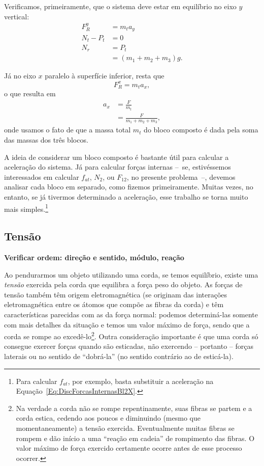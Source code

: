 Verificamos, primeiramente, que o sistema deve estar em equilíbrio no eixo $y$ vertical: 
\begin{align}
    F_R^y &= m_t a_y \\
    N_t - P_t &= 0 \\
    N_r &= P_t \\
    &= (m_1 + m_2 + m_3) g.
\end{align}

Já no eixo $x$ paralelo à superfície inferior, resta que
\begin{equation}
    F_R^x = m_t a_x,
 \end{equation}
 o que resulta em
\begin{align}
    a_x &= \frac{F}{m_t} \\
    &= \frac{F}{m_1 + m_2 + m_3},
\end{align}
%
onde usamos o fato de que a massa total $m_t$ do bloco composto é dada pela soma das massas dos três blocos.

A ideia de considerar um bloco composto é bastante útil para calcular a aceleração do sistema. Já para calcular forças internas --~se, estivéssemos interessados em calcular $f_{at}$, $N_2$, ou $F_{12}$, no presente problema~--, devemos analisar cada bloco em separado, como fizemos primeiramente. Muitas vezes, no entanto, se já tivermos determinado a aceleração, esse trabalho se torna muito mais simples.\footnote{Para calcular $f_{at}$, por exemplo, basta substituir a aceleração na Equação~\eqref{Eq:DiscForcasInternasBl2X}.}

\subsection{Tensão} 

\textbf{Verificar ordem: direção e sentido, módulo, reação}

Ao pendurarmos um objeto utilizando uma corda, se temos equilíbrio, existe uma \emph{tensão} exercida pela corda que equilibra a força peso do objeto. As forças de tensão também têm origem eletromagnética (se originam das interações eletromagnética entre os átomos que compõe as fibras da corda) e têm características parecidas com as da força normal: podemos determiná-las somente com mais detalhes da situação e temos um valor máximo de força, sendo que a corda se rompe ao excedê-lo\footnote{Na verdade a corda não se rompe repentinamente, suas fibras se partem e a corda estica, cedendo aos poucos e diminuindo (mesmo que momentaneamente) a tensão exercida. Eventualmente muitas fibras se rompem e dão início a uma ``reação em cadeia'' de rompimento das fibras. O valor máximo de força exercido certamente ocorre antes de esse processo ocorrer.}. Outra consideração importante é que uma corda só consegue exercer forças quando são esticadas, não exercendo -- portanto -- forças laterais ou no sentido de ``dobrá-la'' (no sentido contrário ao de esticá-la). 

